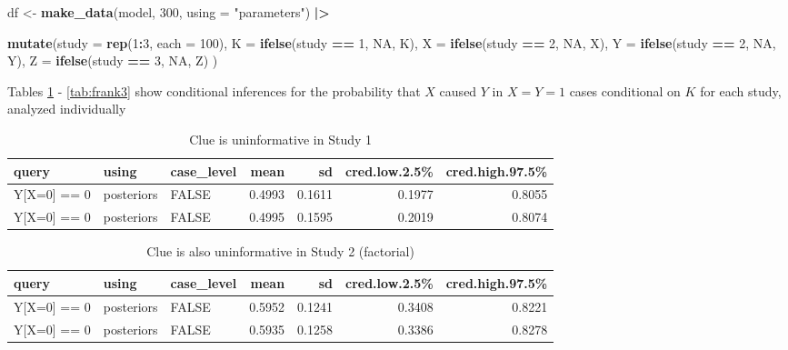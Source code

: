 \documentclass[
  12pt,
]{book}
\newenvironment{Shaded}{\begin{snugshade}}{\end{snugshade}}
\newcommand{\AttributeTok}[1]{\textcolor[rgb]{0.13,0.29,0.53}{#1}}
\newcommand{\ConstantTok}[1]{\textcolor[rgb]{0.56,0.35,0.01}{#1}}
\newcommand{\DecValTok}[1]{\textcolor[rgb]{0.00,0.00,0.81}{#1}}
\newcommand{\FunctionTok}[1]{\textcolor[rgb]{0.13,0.29,0.53}{\textbf{#1}}}
\newcommand{\NormalTok}[1]{#1}
\newcommand{\OtherTok}[1]{\textcolor[rgb]{0.56,0.35,0.01}{#1}}
\newcommand{\SpecialCharTok}[1]{\textcolor[rgb]{0.81,0.36,0.00}{\textbf{#1}}}
\newcommand{\StringTok}[1]{\textcolor[rgb]{0.31,0.60,0.02}{#1}}
\begin{document}
\begin{Shaded}
\begin{Highlighting}[]
\NormalTok{df }\OtherTok{\textless{}{-}} \FunctionTok{make\_data}\NormalTok{(model, }\DecValTok{300}\NormalTok{, }\AttributeTok{using =} \StringTok{"parameters"}\NormalTok{) }\SpecialCharTok{|\textgreater{}}
  
      \FunctionTok{mutate}\NormalTok{(}\AttributeTok{study =} \FunctionTok{rep}\NormalTok{(}\DecValTok{1}\SpecialCharTok{:}\DecValTok{3}\NormalTok{, }\AttributeTok{each =} \DecValTok{100}\NormalTok{),}
             \AttributeTok{K =} \FunctionTok{ifelse}\NormalTok{(study }\SpecialCharTok{==} \DecValTok{1}\NormalTok{, }\ConstantTok{NA}\NormalTok{, K),}
             \AttributeTok{X =} \FunctionTok{ifelse}\NormalTok{(study }\SpecialCharTok{==} \DecValTok{2}\NormalTok{, }\ConstantTok{NA}\NormalTok{, X),}
             \AttributeTok{Y =} \FunctionTok{ifelse}\NormalTok{(study }\SpecialCharTok{==} \DecValTok{2}\NormalTok{, }\ConstantTok{NA}\NormalTok{, Y),}
             \AttributeTok{Z =} \FunctionTok{ifelse}\NormalTok{(study }\SpecialCharTok{==} \DecValTok{3}\NormalTok{, }\ConstantTok{NA}\NormalTok{, Z)}
\NormalTok{             )}
\end{Highlighting}
\end{Shaded}

Tables \ref{tab:frank1} - \ref{tab:frank3} show conditional inferences for the probability that \(X\) caused \(Y\) in \(X=Y=1\) cases conditional on \(K\) for each study, analyzed individually

\begin{table}

\caption{\label{tab:frank1}Clue is uninformative in Study 1}
\centering
\begin{tabular}[t]{l|l|l|r|r|r|r}
\hline
query & using & case\_level & mean & sd & cred.low.2.5\% & cred.high.97.5\%\\
\hline
Y[X=0] == 0 & posteriors & FALSE & 0.4993 & 0.1611 & 0.1977 & 0.8055\\
\hline
Y[X=0] == 0 & posteriors & FALSE & 0.4995 & 0.1595 & 0.2019 & 0.8074\\
\hline
\end{tabular}
\end{table}

\begin{table}

\caption{\label{tab:frank2}Clue is also uninformative in Study 2 (factorial)}
\centering
\begin{tabular}[t]{l|l|l|r|r|r|r}
\hline
query & using & case\_level & mean & sd & cred.low.2.5\% & cred.high.97.5\%\\
\hline
Y[X=0] == 0 & posteriors & FALSE & 0.5952 & 0.1241 & 0.3408 & 0.8221\\
\hline
Y[X=0] == 0 & posteriors & FALSE & 0.5935 & 0.1258 & 0.3386 & 0.8278\\
\hline
\end{tabular}
\end{table}
\end{document}
